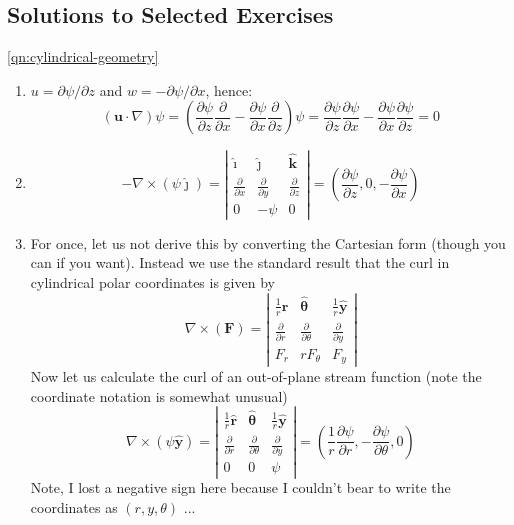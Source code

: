 \documentclass[10pt]{report}
\begin{document}
\begin{answer7}
\newpage
\section{Solutions to Selected Exercises}

\begin{questionnumber}{\ref{qn:cylindrical-geometry}}
	\begin{enumerate}
	\item $u = \partial \psi / \partial z$ and $w = - \partial \psi / \partial x$, hence:
	\[
		({\bm u}\cdot \nabla)\psi = \left( \frac{\partial \psi}{\partial z}
				\frac{\partial}{\partial x} - \frac{\partial \psi}{\partial x}
				\frac{\partial}{\partial z} \right) \psi =
				 \frac{\partial \psi}{\partial z} \frac{\partial \psi}{\partial x} -
				 \frac{\partial \psi}{\partial x} \frac{\partial \psi}{\partial z} = 0
	\]

	\item
	\[
		-\nabla \times (\psi \hat{\bm \jmath}) =
		\left|\begin{array}{ccc}\hat{\bm \imath} & \hat{\bm \jmath} & \hat{\bm k} \\
		\frac{\partial}{\partial x} & \frac{\partial}{\partial y} & \frac{\partial}{\partial z} \\
		0 & -\psi & 0
		\end{array}\right| =
		\left( \frac{\partial \psi}{\partial z}, 0 , -\frac{\partial \psi}{\partial x} \right)
	\]

	\item For once, let us not derive this by converting the Cartesian form
	(though you can if you want). Instead we use the standard result that the curl in
	 cylindrical polar coordinates is given by
	\[
		\nabla \times ({\bm F}) =
		\left|\begin{array}{ccc}\frac{1}{r}\hat{\bm r} &
		                                   \hat{\bm \theta} &
		                        \frac{1}{r}\hat{\bm y} \\
		\frac{\partial}{\partial r} & \frac{\partial}{\partial \theta} & \frac{\partial}{\partial y} \\
		F_{r} & rF_{\theta} & F_{y}
			\end{array}\right|
	\]
	Now let us calculate the curl of an out-of-plane stream function (note the coordinate notation is somewhat unusual)
	\[
		\nabla \times \left( {\psi {\hat{\bm y}}} \right) =
		\left|\begin{array}{ccc}\frac{1}{r}\hat{\bm r} &
		                                   \hat{\bm \theta} &
		                        \frac{1}{r}\hat{\bm y} \\
		\frac{\partial}{\partial r} & \frac{\partial}{\partial \theta} & \frac{\partial}{\partial y} \\
		0 & 0 & \psi
			\end{array}\right| =
		\left( \frac{1}{r}\frac{\partial \psi}{\partial r}, -\frac{\partial \psi}{\partial \theta}, 0 \right)
	\]
	Note, I lost a negative sign here because I couldn't bear to write the coordinates as $(r,y,\theta)$ ...
	\end{enumerate}
\end{questionnumber}


\end{answer7}
\end{document}
